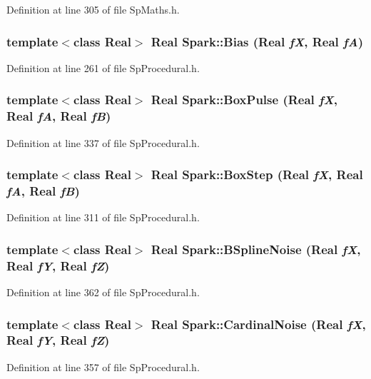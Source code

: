 Definition at line 305 of file Sp\-Maths.h.
\subsubsection{\setlength{\rightskip}{0pt plus 5cm}template$<$class Real$>$ Real Spark::Bias (Real {\em f\-X}, Real {\em f\-A})}\label{namespaceSpark_a96}


Definition at line 261 of file Sp\-Procedural.h.
\subsubsection{\setlength{\rightskip}{0pt plus 5cm}template$<$class Real$>$ Real Spark::Box\-Pulse (Real {\em f\-X}, Real {\em f\-A}, Real {\em f\-B})}\label{namespaceSpark_a104}


Definition at line 337 of file Sp\-Procedural.h.
\subsubsection{\setlength{\rightskip}{0pt plus 5cm}template$<$class Real$>$ Real Spark::Box\-Step (Real {\em f\-X}, Real {\em f\-A}, Real {\em f\-B})}\label{namespaceSpark_a101}


Definition at line 311 of file Sp\-Procedural.h.
\subsubsection{\setlength{\rightskip}{0pt plus 5cm}template$<$class Real$>$ Real Spark::BSpline\-Noise (Real {\em f\-X}, Real {\em f\-Y}, Real {\em f\-Z})}\label{namespaceSpark_a110}


Definition at line 362 of file Sp\-Procedural.h.
\subsubsection{\setlength{\rightskip}{0pt plus 5cm}template$<$class Real$>$ Real Spark::Cardinal\-Noise (Real {\em f\-X}, Real {\em f\-Y}, Real {\em f\-Z})}\label{namespaceSpark_a109}


Definition at line 357 of file Sp\-Procedural.h.
